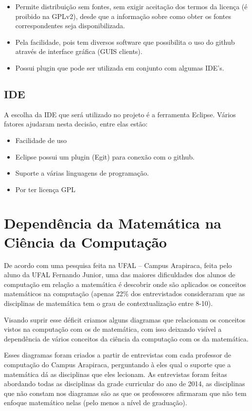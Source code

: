 \documentclass[12pt,a4paper]{article}
\begin{document}
\begin{itemize}
	\begin{itemize}
		\item Permite distribuição sem fontes, sem exigir aceitação dos termos da licença (é proibido na GPLv2), desde que a informação sobre como obter os fontes correspondentes seja disponibilizada.
		\item Pela facilidade, pois tem diversos software que possibilita o uso do github através de interface gráfica (GUIS clients).
		\item Possui plugin que pode ser utilizada em conjunto com algumas IDE's.
	\end{itemize}
	
\end{itemize}

\subsection{IDE}
A escolha da IDE que será utilizado no projeto é a ferramenta Eclipse. Vários fatores ajudaram nesta decisão, entre elas estão:

\begin{itemize}
	\item Facilidade de uso
	\item Eclipse possui um plugin (Egit) para conexão com o github.
	\item Suporte a várias linguagens de programação.
	\item Por ter licença GPL
\end{itemize}

\section{Dependência da Matemática na Ciência da Computação}
De acordo com uma pesquisa feita na UFAL – Campus Arapiraca, feita pelo aluno da UFAL Fernando Junior, uma das maiores dificuldades dos alunos de computação em relação a matemática é descobrir onde são aplicados os conceitos matemáticos na computação (apenas 22\% dos entrevistados consideraram que as disciplinas de matemática tem o grau de contextualização entre 8-10).

Visando suprir esse déficit criamos alguns diagramas que relacionam os conceitos vistos na computação com os de matemática, com isso deixando visível a dependência de vários conceitos da ciência da computação com os da matemática. 

Esses diagramas foram criados a partir de entrevistas com cada professor de computação do Campus Arapiraca, perguntando à eles qual o suporte que a matemática dá as disciplinas que eles lecionam. As entrevistas foram feitas abordando todas as disciplinas da grade curricular do ano de 2014, as disciplinas que não constam nos diagramas são as que os professores afirmaram que não tem enfoque matemático nelas (pelo menos a nível de graduação).
\end{document}
